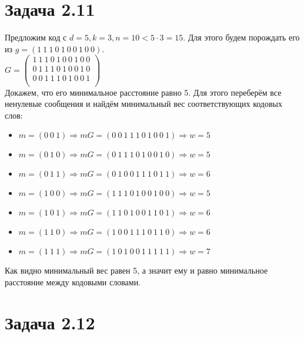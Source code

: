 \documentclass[fontsize=12pt]{article}
\begin{document}
\section*{Задача 2.11}

Предложим код с $d = 5, k = 3, n = 10 < 5 \cdot 3 = 15$. Для этого будем порождать его из $g = (1\ 1\ 1\ 0\ 1\ 0\ 0\ 1\ 0\ 0)$.\\

$G = \begin{pmatrix}
1\ 1\ 1\ 0\ 1\ 0\ 0\ 1\ 0\ 0\\
0\ 1\ 1\ 1\ 0\ 1\ 0\ 0\ 1\ 0\\
0\ 0\ 1\ 1\ 1\ 0\ 1\ 0\ 0\ 1\\
\end{pmatrix}$\\

Докажем, что его минимальное расстояние равно 5. Для этого переберём все ненулевые сообщения и найдём минимальный вес соответствующих кодовых слов:

\begin{itemize}
\item
$m = (0\ 0\ 1) \Rightarrow mG = (0\ 0\ 1\ 1\ 1\ 0\ 1\ 0\ 0\ 1) \Rightarrow w = 5$ 

\item
$m = (0\ 1\ 0) \Rightarrow mG = (0\ 1\ 1\ 1\ 0\ 1\ 0\ 0\ 1\ 0) \Rightarrow w = 5$

\item
$m = (0\ 1\ 1) \Rightarrow mG = (0\ 1\ 0\ 0\ 1\ 1\ 1\ 0\ 1\ 1) \Rightarrow w = 6$

\item
$m = (1\ 0\ 0) \Rightarrow mG = (1\ 1\ 1\ 0\ 1\ 0\ 0\ 1\ 0\ 0) \Rightarrow w = 5$

\item
$m = (1\ 0\ 1) \Rightarrow mG = (1\ 1\ 0\ 1\ 0\ 0\ 1\ 1\ 0\ 1) \Rightarrow w = 6$

\item
$m = (1\ 1\ 0) \Rightarrow mG = (1\ 0\ 0\ 1\ 1\ 1\ 0\ 1\ 1\ 0) \Rightarrow w = 6$

\item
$m = (1\ 1\ 1) \Rightarrow mG = (1\ 0\ 1\ 0\ 0\ 1\ 1\ 1\ 1\ 1) \Rightarrow w = 7$
\end{itemize} 

Как видно минимальный вес равен 5, а значит ему и равно минимальное расстояние между кодовыми словами.

\section*{Задача 2.12}
\end{document}
